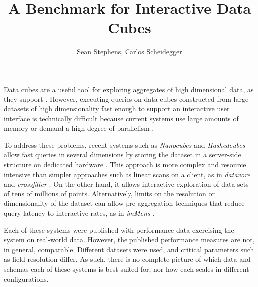 \documentclass[journal]{vgtc}                %
\title{A Benchmark for Interactive Data Cubes}
\author{Sean Stephens, Carlos Scheidegger}
\begin{document}


\maketitle

Data cubes are a useful tool for exploring aggregates of high dimensional data, as they support \cite{data_cubes}. However, executing queries on data cubes constructed from large datasets
of high dimensionality fast enough to support an interactive user interface is
technically difficult
because current systems use large amounts of memory or demand a high degree of
parallelism \cite{nanocubes, parallel_paper}.

To address these problems, recent systems such as \textit{Nanocubes} and
\textit{Hashedcubes} allow fast queries in several dimensions by storing the
dataset in a server-side structure on dedicated hardware
\cite{nanocube}\cite{hashedcube}. This approach is more complex and
resource intensive than simpler approaches such as linear scans on a client,
as in \textit{datavore} and \textit{crossfilter} \cite{datavore,crossfilter}.
On the other hand, it allows interactive exploration of data sets of tens of
millions of points. Alternatively, limits on the resolution or dimensionality of the dataset can allow pre-aggregation techniques that reduce query latency to interactive rates, as in \textit{imMens} \cite{2013-immens}. 

Each of these systems were published with performance data exercising
the system on real-world data. However, the published performance measures
are not, in general, comparable. Different datasets were used, and critical
parameters such as field resolution differ. As such, there is no complete
picture of which data and schemas each of these systems is best suited for,
nor how each scales in different configurations.
\end{document}
